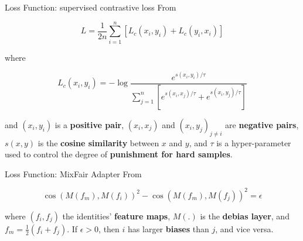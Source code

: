 \documentclass[aspectratio=169,xcolor=dvipsnames]{beamer}
\begin{document}

    

\begin{frame}{Loss Function: supervised contrastive loss}
    From \cite{R46}

    \begin{equation}
       L = \frac{1}{2n} \sum_{i=1}^{n} [L_c (x_i, y_i) + L_c (y_i, x_i)] \tag{1} 
    \end{equation}

    where

    \begin{equation}
        L_c (x_i, y_i) = - \log \frac{e^{s(x_i ,y_i) / \tau}}{\sum_{j=1}^{n} [e^{s(x_i ,x_j) / \tau} + e^{s(x_i ,y_j) / \tau}]} \tag{2}
    \end{equation}

    and $(x_i, y_i)$ is a \textbf{positive pair}, $(x_i, x_j)$ and $(x_i, y_j)_{j \neq i}$ are \textbf{negative pairs}, $s(x, y)$ is the \textbf{cosine similarity} between $x$ and $y$, and $\tau$ is a hyper-parameter used to control the degree of \textbf{punishment for hard samples}.
\end{frame}


\begin{frame}{Loss Function: MixFair Adapter}
    From \cite{R35}

    \begin{equation}
        \label{eq:mixfair-adapter}
        \cos(M(f_m), M(f_i))^2 - \cos(M(f_m), M(f_j))^2 = \epsilon \tag{3}
    \end{equation}

    where $(f_i, f_j)$ the identities' \textbf{feature maps}, $M(.)$ is the \textbf{debias layer}, and $f_m = \frac{1}{2} (f_i + f_j)$. If $\epsilon > 0$, then $i$ has larger \textbf{biases} than $j$, and vice versa.

\end{frame}
\end{document}
